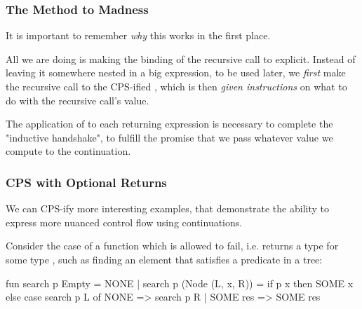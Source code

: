 \documentclass[aspectratio=169]{beamer}
\begin{document}
\begin{frame}[fragile]
  \frametitle{The Method to Madness}

  It is important to remember \textit{why} this works in the first place.

  \vspace{\fill}

  All we are doing is making the binding of the recursive call to 
   explicit. Instead of leaving it somewhere nested in a big 
  expression, to be used later, we \textit{first} make the recursive call to
  the CPS-ified , which is then \textit{given instructions}
  on what to do with the recursive call's value.

  \vspace{\fill}

  The application of  to each returning expression is necessary to
  complete the "inductive handshake", to fulfill the promise that we 
  pass whatever value we compute to the continuation.
\end{frame}

\begin{comment}
  To demonstrate the difference between CPS and direct-style,
  call for a student volunteer.

  I will ask the student to walk across the room and get a 
  "FUNCTIONS ARE POINTERS" sticker. When they return with
  it, I will rip it up.

  I will then ask them to do it again.

  The key distinction is that, I need to remember to rip
  it up when they come back! This is annoying to me, because
  it takes up space in my brain, and generally inconveniences
  me. It would be better if I just told the student to rip it up
  themselves, and then come back with the pieces.
\end{comment}


\begin{frame}[fragile]
  \frametitle{CPS with Optional Returns}

  We can CPS-ify more interesting examples, that demonstrate the
  ability to express more nuanced control flow using continuations.

  Consider the case of a function which is allowed to fail, i.e.
  returns a type  for some type , such as
  finding an element that satisfies a predicate in a tree:

  \begin{codeblock}
    fun search p Empty = NONE
      | search p (Node (L, x, R)) =
          if p x then
            SOME x 
          else
            case search p L of
              NONE => search p R
            | SOME res => SOME res
  \end{codeblock}
\end{frame}
\end{document}
